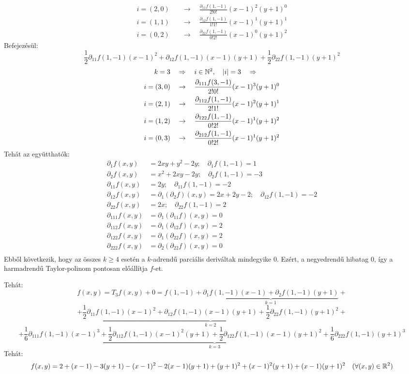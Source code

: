 \documentclass[a4paper,11.5pt]{article}
\begin{document}
\begin{example}
\begin{align*}
			i=(2,0)&\quad \to\quad \frac{\partial_{11}f(1,-1)}{2!0!}(x-1)^2(y+1)^0\\
			i=(1,1)&\quad \to\quad \frac{\partial_{12}f(1,-1)}{1!1!}(x-1)^1(y+1)^1\\
			i=(0,2)&\quad \to\quad \frac{\partial_{22}f(1,-1)}{0!2!}(x-1)^0(y+1)^2
		\end{align*}
		Befejezésül:
		\[ \frac{1}{2}\partial_{11}f(1,-1)(x-1)^2+\partial_{12}f(1,-1)(x-1)(y+1)+\frac{1}{2}\partial_{22}f(1,-1)(y+1)^2 \]
		\begin{align*}
			k=3&\quad \Rightarrow\quad i\in\mathbb{N}^2,\quad |i|=3\quad \Rightarrow\quad\\
			i=(3,0)&\quad \to\quad \frac{\partial_{111}f(3,-1)}{2!0!}(x-1)^3(y+1)^0\\
			i=(2,1)&\quad \to\quad \frac{\partial_{112}f(1,-1)}{2!1!}(x-1)^2(y+1)^1\\
			i=(1,2)&\quad \to\quad \frac{\partial_{122}f(1,-1)}{0!2!}(x-1)^1(y+1)^2\\
			i=(0,3)&\quad \to\quad \frac{\partial_{212}f(1,-1)}{0!2!}(x-1)^1(y+1)^2
		\end{align*}
		Tehát az együtthatók:
		\begin{align*}
			\partial_1f(x,y)&=2xy+y^2-2y;\quad \partial_1f(1,-1)=1\\
			\partial_2f(x,y)&=x^2+2xy-2y;\quad \partial_2f(1,-1)=-3\\
			\partial_{11}f(x,y)&=2y;\quad \partial_{11}f(1,-1)=-2\\
			\partial_{12}f(x,y)&=\partial_1(\partial_2f)(x,y)=2x+2y-2;\quad \partial_{12}f(1,-1)=-2\\
			\partial_{22}f(x,y)&=2x;\quad \partial_{22}f(1,-1)=2\\
			\partial_{111}f(x,y)&=\partial_1(\partial_{11}f)(x,y)=0\\
			\partial_{112}f(x,y)&=\partial_1(\partial_{12}f)(x,y)=2\\
			\partial_{122}f(x,y)&=\partial_1(\partial_{22}f)(x,y)=2\\
			\partial_{222}f(x,y)&=\partial_2(\partial_{22}f)(x,y)=0\\
		\end{align*}
		Ebből következik, hogy az összes $k\geq4$ esetén a $k$-adrendű parciális deriváltak mindegyike 0. Ezért, a negyedrendű hibatag 0, így a harmadrendű Taylor-polinom pontosan előállítja $f$-et.
		
		Tehát:
		\[ f(x,y)=T_3f(x,y)+0=f(1,-1)+\underbrace{\partial_1f(1,-1)(x-1)+\partial_2f(1,-1)(y+1)}_{k=1}+\]
		\[+\underbrace{\frac{1}{2}\partial_{11}f(1,-1)(x-1)^2+\partial_{12}f(1,-1)(x-1)(y+1)+\frac{1}{2}\partial_{22}f(1,-1)(y+1)^2}_{k=2}+\]
		\[+\underbrace{\frac{1}{6}\partial_{111}f(1,-1)(x-1)^3+\frac{1}{2}\partial_{112}f(1,-1)(x-1)^2(y+1)+\frac{1}{2}\partial_{122}f(1,-1)(x-1)(y+1)^2+\frac{1}{6}\partial_{222}f(1,-1)(y+1)^3}_{k=3} \]
		Tehát:
		\[ f(x,y)=2+(x-1)-3(y+1)-(x-1)^2-2(x-1)(y+1)+(y+1)^2+(x-1)^2(y+1)+(x-1)(y+1)^2 \quad (\forall(x,y)\in\mathbb{R}^2)\]
	\end{example}
\end{document}
